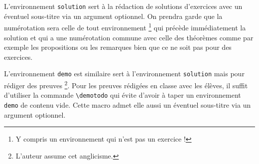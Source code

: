 L'environnement \verb+solution+ sert à la rédaction de solutions d'exercices avec un éventuel sous-titre via un argument optionnel. On prendra garde que la numérotation sera celle de tout environnement
\footnote{
	Y compris un environnement qui n'est pas un exercice !
}
qui précède immédiatement la solution et qui a une numérotation commune avec celle des théorèmes comme par exemple les propositions ou les remarques bien que ce ne soit pas pour des exercices.


\medskip


L'environnement \verb+demo+ est similaire sert à l'environnement \verb+solution+ mais pour rédiger des preuves
\footnote{
	L'auteur assume cet anglicisme.
}.
Pour les preuves rédigées en classe avec les élèves, il suffit d'utiliser la commande \verb+\demotodo+ qui évite d'avoir à taper un environnement \verb+demo+ de contenu vide. Cette macro admet elle aussi un éventuel sous-titre via un argument optionnel.